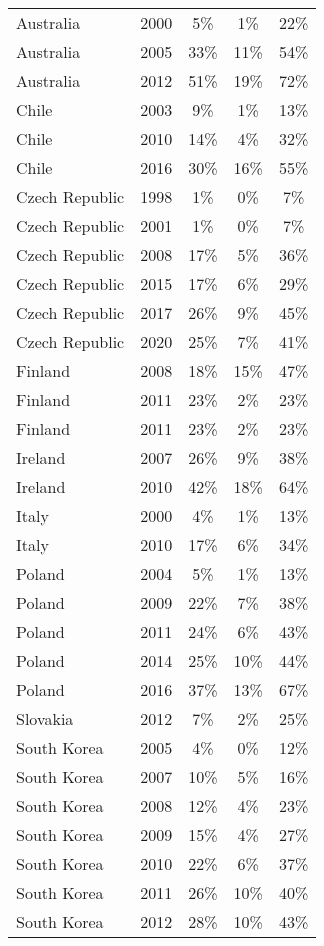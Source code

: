 \begin{longtable}[t]{lcccc}
\endfoot
\bottomrule
\endlastfoot
Australia & 2000 & 5\% & 1\% & 22\%\\
Australia & 2005 & 33\% & 11\% & 54\%\\
Australia & 2012 & 51\% & 19\% & 72\%\\
\addlinespace
Chile & 2003 & 9\% & 1\% & 13\%\\
Chile & 2010 & 14\% & 4\% & 32\%\\
Chile & 2016 & 30\% & 16\% & 55\%\\
\addlinespace
Czech Republic & 1998 & 1\% & 0\% & 7\%\\
Czech Republic & 2001 & 1\% & 0\% & 7\%\\
Czech Republic & 2008 & 17\% & 5\% & 36\%\\
Czech Republic & 2015 & 17\% & 6\% & 29\%\\
Czech Republic & 2017 & 26\% & 9\% & 45\%\\
Czech Republic & 2020 & 25\% & 7\% & 41\%\\
\addlinespace
Finland & 2008 & 18\% & 15\% & 47\%\\
Finland & 2011 & 23\% & 2\% & 23\%\\
Finland & 2011 & 23\% & 2\% & 23\%\\
\addlinespace
Ireland & 2007 & 26\% & 9\% & 38\%\\
Ireland & 2010 & 42\% & 18\% & 64\%\\
\addlinespace
Italy & 2000 & 4\% & 1\% & 13\%\\
Italy & 2010 & 17\% & 6\% & 34\%\\
\addlinespace
Poland & 2004 & 5\% & 1\% & 13\%\\
Poland & 2009 & 22\% & 7\% & 38\%\\
Poland & 2011 & 24\% & 6\% & 43\%\\
Poland & 2014 & 25\% & 10\% & 44\%\\
Poland & 2016 & 37\% & 13\% & 67\%\\
\addlinespace
Slovakia & 2012 & 7\% & 2\% & 25\%\\
\addlinespace
South Korea & 2005 & 4\% & 0\% & 12\%\\
South Korea & 2007 & 10\% & 5\% & 16\%\\
South Korea & 2008 & 12\% & 4\% & 23\%\\
South Korea & 2009 & 15\% & 4\% & 27\%\\
South Korea & 2010 & 22\% & 6\% & 37\%\\
South Korea & 2011 & 26\% & 10\% & 40\%\\
South Korea & 2012 & 28\% & 10\% & 43\%\\

\end{longtable}
